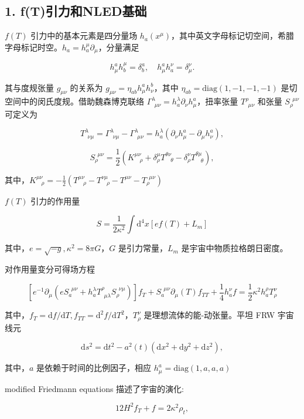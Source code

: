\documentclass[aps,prl,preprint,groupedaddress]{revtex4-2}
\begin{document}
\subsection{1. f(T)引力和NLED基础}

$f(T)$ 引力中的基本元素是四分量场 $h_a(x^\mu)$，其中英文字母标记切空间，希腊字母标记时空。$h_a=h_a^\mu\partial_\mu$，分量满足

$$
h_\mu^a h_b^\mu = \delta_b^a,\quad h_\mu^a h_a^\nu = \delta_\mu^\nu.
$$

其与度规张量 $g_{\mu\nu}$ 的关系为 $ g_{\mu\nu}=\eta_{ab}h_\mu^ah_\nu^b$，其中 $\eta_{ab}=\mathrm{diag}(1,-1,-1,-1)$ 是切空间中的闵氏度规。借助魏森博克联络 $\Gamma_{~~\mu\nu}^{\lambda}=h_a^\lambda \partial_\nu h_\mu^a$，扭率张量 $T^\rho_{~~\mu\nu}$ 和张量 $S_\rho^{~~\mu\nu}$ 可定义为

$$
T^{\lambda}_{~~\nu\mu} = \Gamma^\lambda_{~~\nu\mu} - \Gamma^\lambda_{~~\mu\nu} = h_a^\lambda\left(\partial_\nu h_\mu^a - \partial_\mu h_\nu^a \right),
$$

$$
S_\rho^{~~\mu\nu} = \frac{1 }{2 } \left(K^{\mu\nu}_{~~~~\rho} + \delta_\rho^\mu T^{\theta\nu}_{~~~~\theta} - \delta_\rho^\nu T^{\theta\mu}_{~~~~\theta} \right),
$$

其中，$K^{\mu\nu}_{~~~~\rho}=-\frac{1}{2}(T^{\mu\nu}_{~~~~\rho}-T^{\nu\mu}_{~~~~\rho}-T^{\mu\nu}-T_\rho^{~~\mu\nu}) $

$f(T)$ 引力的作用量

$$
S = \frac{1}{2\kappa^2}\int \mathrm{d}^4 x [ef(T)+L_m]
$$

其中，$e=\sqrt{-g},\kappa^2=8\pi G$，$G$ 是引力常量，$L_m$ 是宇宙中物质拉格朗日密度。

对作用量变分可得场方程

$$
\left[e^{-1}\partial_\mu \left(e S_a^{~~\mu\nu} + h_a^\lambda T^\rho_{~~\mu\lambda} S_\rho^{~~\nu\mu} \right) \right] f_T + S_a^{~~\mu\nu} \partial_\mu(T) f_{TT} + \frac{1 }{4 } h_a^\nu f
=\frac{1 }{2 } \kappa^2 h_a^\rho T_\rho^\nu
$$

其中，$f_T=\mathrm{d}f/\mathrm{d}T,f_{TT}=\mathrm{d}^2f/\mathrm{d}T^2$，$T_\rho^\nu$ 是理想流体的能-动张量。平坦 FRW 宇宙线元

$$
\mathrm{d}s^2
=\mathrm{d}t^2 - a^2(t)\left(\mathrm{d}x^2+\mathrm{d}y^2+\mathrm{d}z^2 \right),
$$

其中，$a$ 是依赖于时间的比例因子，相应 $h_\mu^a=\mathrm{diag}(1,a,a,a)$

modified Friedmann equations 描述了宇宙的演化:

$$
12 H^2 f_T + f = 2\kappa^2 \rho_t,
$$
\end{document}
